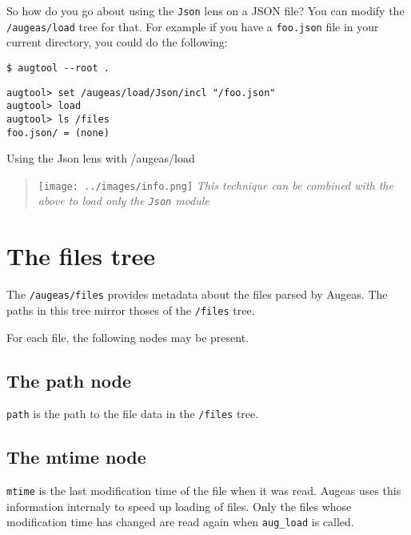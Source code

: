 So how do you go about using the \verb!Json! lens on a JSON file? You can modify the \nolinkurl{/augeas/load} tree for that. For example if you have a \verb!foo.json! file in your current directory, you could do the following:

   

\begin{listing}
  \begin{verbatim}
$ augtool --root .
  \end{verbatim}
  \begin{verbatim}
augtool> set /augeas/load/Json/incl "/foo.json"
augtool> load
augtool> ls /files
foo.json/ = (none)
  \end{verbatim}
  \caption{Using the Json lens with /augeas/load}
  \label{lst:metadata_json_lens}
\end{listing}

\begin{quote}
\texttt{[image: ../images/info.png]} \emph{This technique can be combined with the above to load only the \texttt{Json} module}

\end{quote}
\section{The files tree}


The \nolinkurl{/augeas/files} provides metadata about the files parsed by Augeas. The paths in this tree mirror thoses of the \nolinkurl{/files} tree.

For each file, the following nodes may be present.

\subsection{The path node}

\verb!path! is the path to the file data in the \nolinkurl{/files} tree.

\subsection{The mtime node}

\verb!mtime! is the last modification time of the file when it was read. Augeas uses this information internaly to speed up loading of files. Only the files whose modification time has changed are read again when \verb!aug_load! is called.


